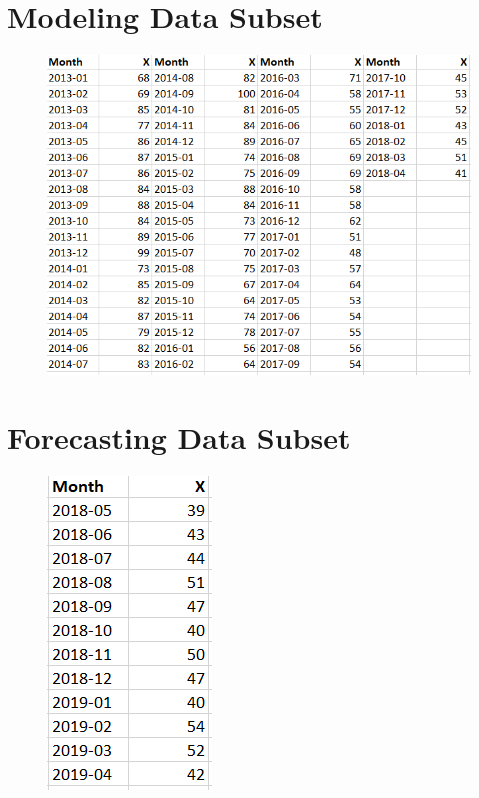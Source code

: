 \documentclass[12pt]{article}
\begin{document}
\newpage
\begin{appendices}	
	\section{Modeling Data Subset}
	
	\begin{figure}[h!]
		\includegraphics[scale=1.1]{Data_Table_Model.png}
	\end{figure}

\newpage

	\section{Forecasting Data Subset}

\begin{figure}[h!]
	\includegraphics[scale=1.1]{Data_Table_Forecast.png}
\end{figure}

\end{appendices}
\end{document}
